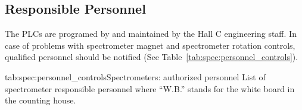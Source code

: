 {\subsection{Responsible Personnel}
The PLCs are programed by and maintained by the Hall C engineering
staff.  In case of problems with spectrometer magnet and spectrometer
rotation controls, qualified personnel should be notified
(See Table~\ref{tab:spec:personnel_controls}).

\begin{namestab}{tab:spec:personnel_controls}{Spectrometers: authorized personnel}{%
      List of spectrometer responsible personnel where ``W.B.'' stands for the white board
      in the counting house.}
   \MikeFowler{}
   \PaulBrindza{}
   \SteveLassiter{}
   \EricSun{}
\end{namestab}

} %
